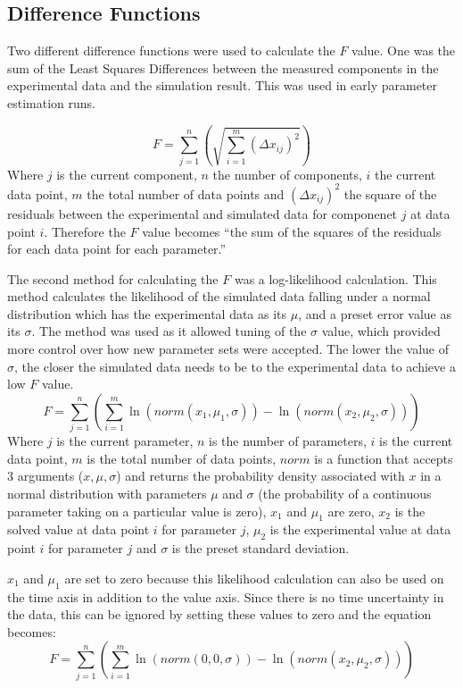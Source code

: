 \subsection{Difference Functions}
Two different difference functions were used to calculate the $F$ value. One was the sum of the Least Squares Differences between the measured components in the experimental data and the simulation result. This was used in early parameter estimation runs.

\begin{equation}
F = \sum^{n}_{j=1}\left(\sqrt{\sum^{m}_{i=1} (\Delta x_{ij})^2}\right)
\end{equation}
Where $j$ is the current component, $n$ the number of components, $i$ the current data point, $m$ the total number of data points and $(\Delta x_{ij})^2$ the square of the residuals between the experimental and simulated data for componenet $j$ at data point $i$. Therefore the $F$ value becomes ``the sum of the squares of the residuals for each data point for each parameter.''

The second method for calculating the $F$ was a log-likelihood calculation. This method calculates the likelihood of the simulated data falling under a normal distribution which has the experimental data as its $\mu$, and a preset error value as its $\sigma$. The method was used as it allowed tuning of the $\sigma$ value, which provided more control over how new parameter sets were accepted. The lower the value of $\sigma$, the closer the simulated data needs to be to the experimental data to achieve a low $F$ value.
\begin{equation}
F = \sum^{n}_{j=1}\left(\sum^{m}_{i=1}\ln(norm(x_1,\mu_1,\sigma)) - \ln(norm(x_2,\mu_2,\sigma))\right)
\end{equation}
Where $j$ is the current parameter, $n$ is the number of parameters, $i$ is the current data point, $m$ is the total number of data points, $norm$ is a function that accepts 3 arguments ($x, \mu, \sigma$) and returns the probability density associated with $x$ in a normal distribution with parameters $\mu$ and $\sigma$ (the probability of a continuous parameter taking on a particular value is zero), $x_1$ and $\mu_1$ are zero, $x_2$ is the solved value at data point $i$ for parameter $j$, $\mu_2$ is the experimental value at data point $i$ for parameter $j$ and $\sigma$ is the preset standard deviation.

$x_1$ and $\mu_1$ are set to zero because this likelihood calculation can also be used on the time axis in addition to the value axis. Since there is no time uncertainty in the data, this can be ignored by setting these values to zero and the equation becomes:
\begin{equation}
F = \sum^{n}_{j=1}\left(\sum^{m}_{i=1}\ln(norm(0,0,\sigma)) - \ln(norm(x_2,\mu_2,\sigma))\right)
\end{equation}

